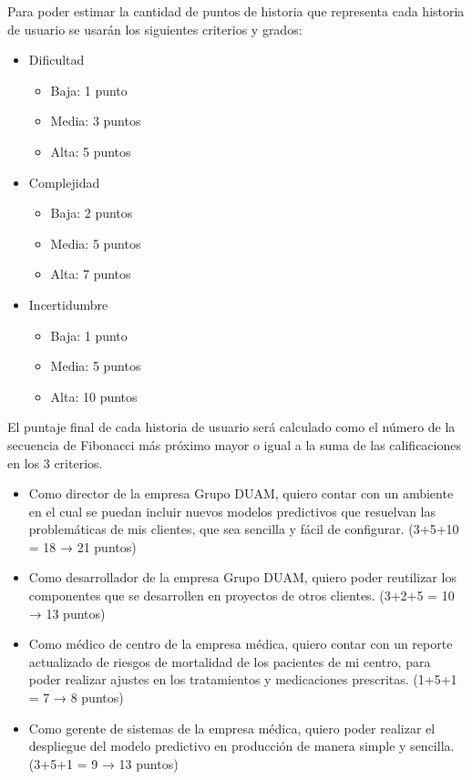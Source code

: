 \documentclass[
11pt, %
]{charter}
\begin{document}
Para poder estimar la cantidad de puntos de historia que representa cada historia de usuario se usarán los siguientes criterios y grados:

\begin{itemize}
	\item Dificultad
	\begin{itemize}
		\item Baja: 1 punto
		\item Media: 3 puntos
		\item Alta: 5 puntos
	\end{itemize}
	\item Complejidad
	\begin{itemize}
		\item Baja: 2 puntos
		\item Media: 5 puntos
		\item Alta: 7 puntos
	\end{itemize}
	\item Incertidumbre
	\begin{itemize}
		\item Baja: 1 punto
		\item Media: 5 puntos
		\item Alta: 10 puntos
	\end{itemize}
\end{itemize}

El puntaje final de cada historia de usuario será calculado como el número de la secuencia de Fibonacci más próximo mayor o igual a la suma de las calificaciones en los 3 criterios.

\begin{itemize}
	\item Como director de la empresa Grupo DUAM, quiero contar con un ambiente en el cual se puedan incluir nuevos modelos predictivos que resuelvan las problemáticas de mis clientes, que sea sencilla y fácil de configurar. (3+5+10 = 18 → 21 puntos)
	\item Como desarrollador de la empresa Grupo DUAM, quiero poder reutilizar los componentes que se desarrollen en proyectos de otros clientes. (3+2+5 = 10 → 13 puntos)
	\item Como médico de centro de la empresa médica, quiero contar con un reporte actualizado de riesgos de mortalidad de los pacientes de mi centro, para poder realizar ajustes en los tratamientos y medicaciones prescritas. (1+5+1 = 7 → 8 puntos)
	\item Como gerente de sistemas de la empresa médica, quiero poder realizar el despliegue del modelo predictivo en producción de manera simple y sencilla. (3+5+1 = 9 → 13 puntos)
\end{itemize}
\end{document}
